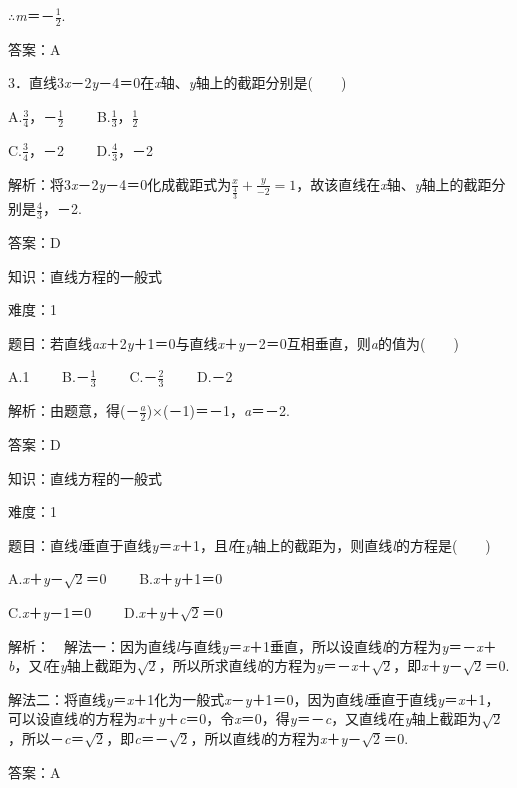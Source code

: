 \documentclass{article} %
\begin{document}
$\mathrm{\therefore}$\textit{m}＝－$\frac{1}{2}$.

答案：A

3．直线3\textit{x}－2\textit{y}－4＝0在\textit{x}轴、\textit{y}轴上的截距分别是(　　)

A.$\frac{3}{4}$，－$\frac{1}{2}$　　  B.$\frac{1}{3}$，$\frac{1}{2}$

C.$\frac{3}{4}$，－2　　  D.$\frac{4}{3}$，－2

解析：将3\textit{x}－2\textit{y}－4＝0化成截距式为$\frac{x}{\frac{4}{3}}+\frac{y}{-2}=1$，故该直线在\textit{x}轴、\textit{y}轴上的截距分别是$\frac{4}{3}$，－2.

答案：D

知识：直线方程的一般式

难度：1

题目：若直线\textit{ax}＋2\textit{y}＋1＝0与直线\textit{x}＋\textit{y}－2＝0互相垂直，则\textit{a}的值为(　　)

A.1　　 B.－$\frac{1}{3}$　　 C.－$\frac{2}{3}$　　 D.－2

解析：由题意，得(－$\frac{a}{2}$)$\mathrm{\times}$(－1)＝－1，\textit{a}＝－2.

答案：D

知识：直线方程的一般式

难度：1

题目：直线\textit{l}垂直于直线\textit{y}＝\textit{x}＋1，且\textit{l}在\textit{y}轴上的截距为，则直线\textit{l}的方程是(　　)

A.\textit{x}＋\textit{y}－$\sqrt{2}$＝0　　  B.\textit{x}＋\textit{y}＋1＝0

C.\textit{x}＋\textit{y}－1＝0　　  D.\textit{x}＋\textit{y}＋$\sqrt{2}$＝0

解析：　解法一：因为直线\textit{l}与直线\textit{y}＝\textit{x}＋1垂直，所以设直线\textit{l}的方程为\textit{y}＝－\textit{x}＋\textit{b}，又\textit{l}在\textit{y}轴上截距为$\sqrt{2}$，所以所求直线\textit{l}的方程为\textit{y}＝－\textit{x}＋$\sqrt{2}$，即\textit{x}＋\textit{y}－$\sqrt{2}$＝0.

解法二：将直线\textit{y}＝\textit{x}＋1化为一般式\textit{x}－\textit{y}＋1＝0，因为直线\textit{l}垂直于直线\textit{y}＝\textit{x}＋1，可以设直线\textit{l}的方程为\textit{x}＋\textit{y}＋\textit{c}＝0，令\textit{x}＝0，得\textit{y}＝－\textit{c}，又直线\textit{l}在\textit{y}轴上截距为$\sqrt{2}$，所以－\textit{c}＝$\sqrt{2}$，即\textit{c}＝－$\sqrt{2}$，所以直线\textit{l}的方程为\textit{x}＋\textit{y}－$\sqrt{2}$＝0.

答案：A
\end{document}
